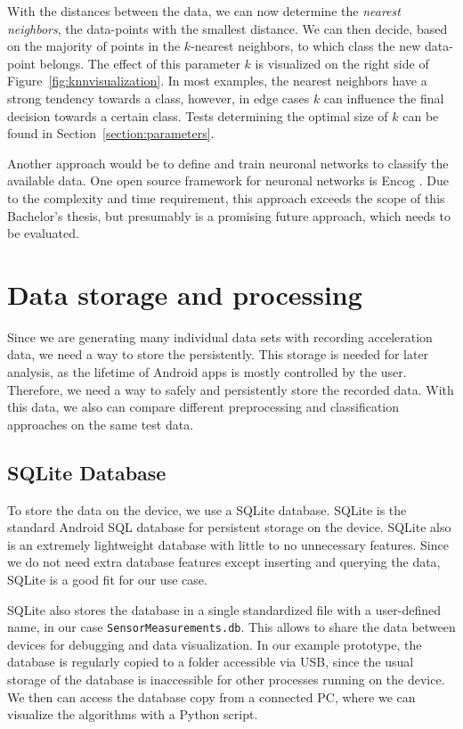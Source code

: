 With the distances between the data, we can now determine the \emph{nearest neighbors}, \ie the data-points with the smallest distance. We can then decide, based on the majority of points in the $k$-nearest neighbors, to which class the new data-point belongs. The effect of this parameter $k$ is visualized on the right side of Figure~\ref{fig:knnvisualization}. In most examples, the nearest neighbors have a strong tendency towards a class, however, in edge cases $k$ can influence the final decision towards a certain class. Tests determining the optimal size of $k$ can be found in Section~\ref{section:parameters}.

Another approach would be to define and train neuronal networks to classify the available data. One open source framework for neuronal networks is Encog \cite{heaton2016encog}. Due to the complexity and time requirement, this approach exceeds the scope of this Bachelor's thesis, but presumably is a promising future approach, which needs to be evaluated.

\section{Data storage and processing}
\label{section:datastorage}
Since we are generating many individual data sets with recording acceleration data, we need a way to store the persistently. This storage is needed for later analysis, as the lifetime of Android apps is mostly controlled by the user. Therefore, we need a way to safely and persistently store the recorded data. With this data, we also can compare different preprocessing and classification approaches on the same test data.

\subsection{SQLite Database}
To store the data on the device, we use a SQLite database. SQLite is the standard Android SQL database for persistent storage on the device. SQLite also is an extremely lightweight database with little to no unnecessary features. Since we do not need extra database features except inserting and querying the data, SQLite is a good fit for our use case.

SQLite also stores the database in a single standardized file with a user-defined name, in our case \lstinline$SensorMeasurements.db$. This allows to share the data between devices for debugging and data visualization. In our example prototype, the database is regularly copied to a folder accessible via USB, since the usual storage of the database is inaccessible for other processes running on the device. We then can access the database copy from a connected PC, where we can visualize the algorithms with a Python script. %

